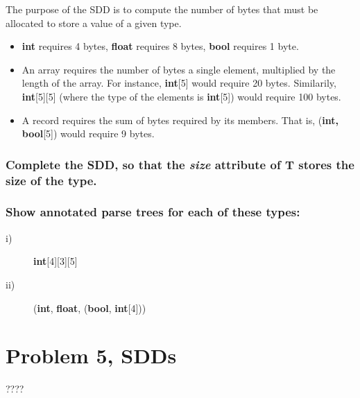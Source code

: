 The purpose of the SDD is to compute the number of bytes that must be allocated to store a value of a given type.
\begin{itemize}
	\item \textbf{int} requires 4 bytes, \textbf{float} requires 8 bytes, \textbf{bool} requires 1 byte.
	\item An array requires the number of bytes a single element, multiplied by the length of the array. For instance, \textbf{int}[5] would require 20 bytes. Similarily, \textbf{int}[5][5] (where the type of the elements is \textbf{int}[5]) would require 100 bytes.
	\item A record requires the sum of bytes required by its members. That is, (\textbf{int, bool}[5]) would require 9 bytes.
\end{itemize}

\subsubsection{Complete the SDD, so that the \textit{size} attribute of T stores the size of the type.}

\subsubsection{Show annotated parse trees for each of these types:}
\begin{description}
	\item[i)] \textbf{int}[4][3][5]
	\item[ii)] (\textbf{int}, \textbf{float}, (\textbf{bool}, \textbf{int}[4]))

\end{description}

\newpage
\section{Problem 5, SDDs}
????
